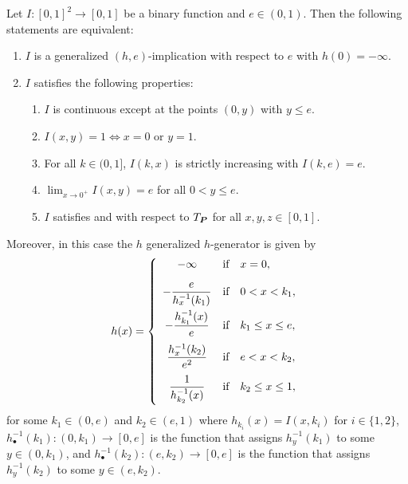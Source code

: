 \begin{theorem}\label{th:(h,e)h(0)-inf} Let $I:[0,1]^2 \to [0,1]$ be a binary function and $e \in (0,1)$. Then the following statements are equivalent:	\begin{enumerate}[label=(\roman*)]
		\item $I$ is a generalized $(h,e)$-implication with respect to $e$ with $h(0)= - \infty$.
		\item $I$ satisfies the following properties:
		\begin{enumerate}[label = \arabic*.]
			\item $I$ is continuous except at the points $(0,y)$ with $y\leq e$.
			\item $I(x,y)=1 \Leftrightarrow x=0 \text{ or } y=1$.
			\item For all $k \in (0,1]$, $I(k,x)$ is strictly increasing with $I(k,e)=e$.
			\item $\displaystyle \lim_{x \to 0^+} I(x,y)=e$ for all $0<y \leq e$.
			\item $I$ satisfies \LIey and \LIex with respect to $T_{\bm{P}}$ for all $x,y,z \in [0,1]$.
		\end{enumerate}
	\end{enumerate}
		Moreover, in this case the $h$ generalized $h$-generator is given by
		$$h(x)=\left\{ \begin{array}{ccl}
			- \infty &  \hbox{if} & x=0, \\[1em]             
			\displaystyle -\frac{e}{h_{x}^{-1}(k_1)} &  \hbox{if} & 0<x<k_1, \\[1em]
			\displaystyle -\frac{h_{k_1}^{-1}(x)}{e} &   \hbox{if}  & k_1 \leq x \leq e, \\[1em]
			\displaystyle \frac{h_x^{-1}(k_2)}{e^2} &   \hbox{if}  & e<x<k_2, \\[1em]
			\displaystyle \frac{1}{h_{k_2}^{-1}(x)} &   \hbox{if}  & k_2\leq x\leq 1, \\[1em]
		\end{array}
		\right.
		$$
		for some $k_1 \in (0,e)$ and $k_2 \in (e,1)$ where $h_{k_i}(x)=I(x,k_i)$ for $i \in \{1,2\}$, $h_{\bullet}^{-1}(k_1):(0,k_1)\to [0,e]$ is the function that assigns $h_y^{-1}(k_1)$ to some $ y \in (0,k_1)$, and $h_{\bullet}^{-1}(k_2):(e,k_2)\to [0,e]$ is the function that assigns $h_y^{-1}(k_2)$ to some $ y \in (e,k_2)$.
\end{theorem}
